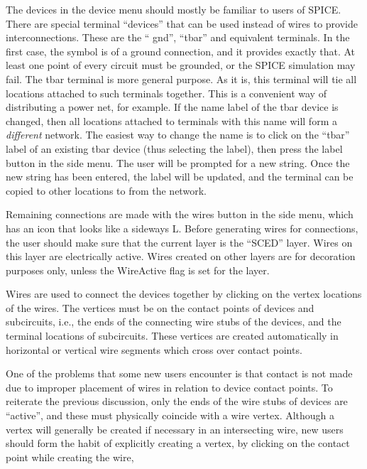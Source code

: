 The devices in the device menu should mostly be familiar to users of
SPICE.  There are special terminal ``devices'' that can be used
instead of wires to provide interconnections.  These are the ``{\et
gnd}'', ``{\et tbar}'' and equivalent terminals.  In the first case,
the symbol is of a ground connection, and it provides exactly that. 
At least one point of every circuit must be grounded, or the SPICE
simulation may fail.  The {\et tbar} terminal is more general purpose. 
As it is, this terminal will tie all locations attached to such
terminals together.  This is a convenient way of distributing a power
net, for example.  If the name label of the {\et tbar} device is
changed, then all locations attached to terminals with this name will
form a {\it different} network.  The easiest way to change the name is
to click on the ``tbar'' label of an existing {\et tbar} device (thus
selecting the label), then press the {\cb label} button in the side
menu.  The user will be prompted for a new string.  Once the new
string has been entered, the label will be updated, and the terminal
can be copied to other locations to from the network.

Remaining connections are made with the {\cb wires} button in the side
menu, which has an icon that looks like a sideways L.  Before
generating wires for connections, the user should make sure that the
current layer is the ``SCED'' layer.  Wires on this layer are
electrically active.  Wires created on other layers are for decoration
purposes only, unless the {\et WireActive} flag is set for the layer.

Wires are used to connect the devices together by clicking on the
vertex locations of the wires.  The vertices must be on the contact
points of devices and subcircuits, i.e., the ends of the connecting
wire stubs of the devices, and the terminal locations of subcircuits. 
These vertices are created automatically in horizontal or vertical
wire segments which cross over contact points.

One of the problems that some new users encounter is that contact is
not made due to improper placement of wires in relation to device
contact points.  To reiterate the previous discussion, only the ends
of the wire stubs of devices are ``active'', and these must physically
coincide with a wire vertex.  Although a vertex will generally be
created if necessary in an intersecting wire, new users should form
the habit of explicitly creating a vertex, by clicking on the contact
point while creating the wire,

